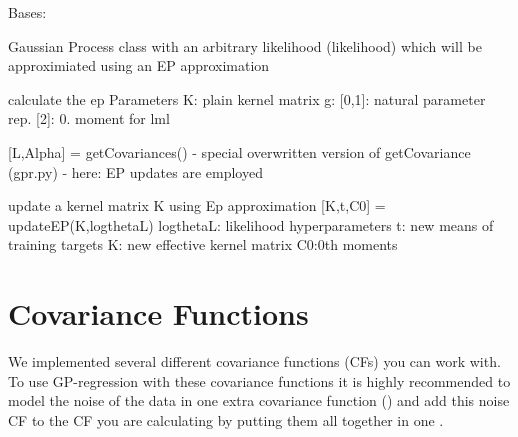 \documentclass[letterpaper,10pt,english]{sphinxmanual}
\begin{document}
\begin{fulllineitems}
\label{gp:pygp.gp.gprEP.GPEP}
Bases: {\hyperref[gp:pygp.gp.gp_base.GP]{}}

Gaussian Process class with an arbitrary likelihood (likelihood) which will be approximiated
using an EP approximation

\begin{fulllineitems}
\label{gp:pygp.gp.gprEP.GPEP.epComputeParams}
calculate the ep Parameters
K: plain kernel matrix
g: {[}0,1{]}: natural parameter rep. {[}2{]}: 0. moment for lml

\end{fulllineitems}


\begin{fulllineitems}
\label{gp:pygp.gp.gprEP.GPEP.getCovariances}
{[}L,Alpha{]} = getCovariances()
- special overwritten version of getCovariance (gpr.py)
- here: EP updates are employed

\end{fulllineitems}


\begin{fulllineitems}
\label{gp:pygp.gp.gprEP.GPEP.updateEP}
update a kernel matrix K using Ep approximation
{[}K,t,C0{]} = updateEP(K,logthetaL)
logthetaL: likelihood hyperparameters
t: new means of training targets
K: new effective kernel matrix
C0:0th moments

\end{fulllineitems}


\end{fulllineitems}

\label{covars:module-pygp.covar}

\chapter{Covariance Functions}
\label{covars::doc}\label{covars:covariance-functions}
We implemented several different covariance functions (CFs) you can work with. To use GP-regression with these covariance functions it is highly recommended to model the noise of the data in one extra covariance function () and add this noise CF to the CF you are calculating by putting them all together in one {\hyperref[covars:pygp.covar.combinators.SumCF]{}}.
\end{document}
